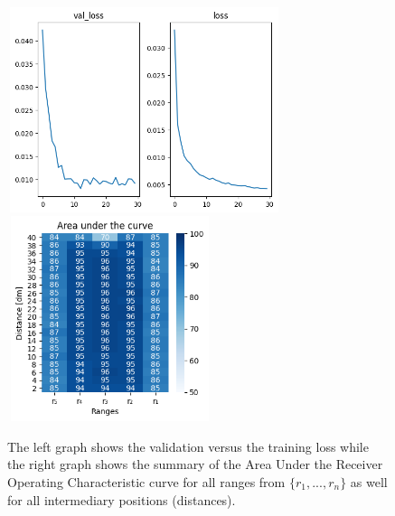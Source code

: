 \begin{multicols}{2}
\begin{itemize}
\end{itemize}
\end{multicols}\begin{figure}[H]%
\centering
\includegraphics[width=8cm,height=6cm]{3_models/models_62/graph_62.png}
\hspace{0.2 cm}
\includegraphics[width=6cm,height=6cm]{4_plots/plots_62/AUC_62.png}
\caption{The left graph shows the validation versus the training loss while the right graph shows the summary of the Area Under the Receiver Operating Characteristic curve for all ranges from $\{r_{1}, ... ,r_{n}\}$ as well for all intermediary positions (distances).}
\label{auc_62}
\end{figure}

